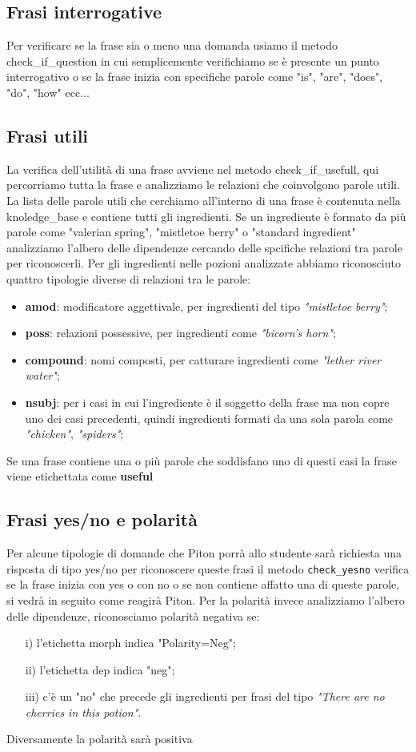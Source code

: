 \subsection{Frasi interrogative}
Per verificare se la frase sia o meno una domanda usiamo il metodo check\_if\_question in cui semplicemente verifichiamo se è presente un punto interrogativo o se la frase inizia con specifiche parole come "is", "are", "does", "do", "how" ecc...
\subsection{Frasi utili}
La verifica dell'utilità di una frase avviene nel metodo check\_if\_usefull, qui percorriamo tutta la frase e analizziamo le relazioni che coinvolgono parole utili. La lista delle parole utili che cerchiamo all'interno di una frase è contenuta nella knoledge\_base e contiene tutti gli ingredienti. Se un ingrediente è formato da più parole come "valerian spring", "mistletoe berry" o  "standard ingredient" analizziamo l'albero delle dipendenze cercando delle spcifiche relazioni tra parole per riconoscerli. Per gli ingredienti nelle pozioni analizzate abbiamo riconosciuto quattro tipologie diverse di relazioni tra le parole:
\begin{itemize}
    \item \textbf{amod}: modificatore aggettivale, per ingredienti del tipo \textit{"mistletoe berry"};
    \item \textbf{poss}: relazioni possessive, per ingredienti come \textit{"bicorn's horn"};
    \item \textbf{compound}: nomi composti, per catturare ingredienti come \textit{"lether river water"};
    \item \textbf{nsubj}: per i casi in cui l'ingrediente è il soggetto della frase ma non copre uno dei casi precedenti, quindi ingredienti formati da una sola parola come \textit{"chicken"}, \textit{"spiders"};
\end{itemize}
Se una frase contiene una o più parole che soddisfano uno di questi casi la frase viene etichettata come \textbf{useful}

\subsection{Frasi yes/no e polarità}
Per alcune tipologie di domande che Piton porrà allo studente sarà richiesta una risposta di tipo yes/no per riconoscere queste frasi il metodo \texttt{check\_yesno} verifica se la frase inizia con yes o con no o se non contiene affatto una di queste parole, si vedrà in seguito come reagirà Piton.
Per la polarità invece analizziamo l'albero delle dipendenze, riconosciamo polarità negativa se:
\begin{itemize}
    \item[i)] l'etichetta morph indica "Polarity=Neg";
    \item[ii)] l'etichetta dep indica "neg";
    \item[iii)] c'è un "no" che precede gli ingredienti per frasi del tipo \textit{"There are no cherries in this potion"}.
\end{itemize}
Diversamente la polarità sarà positiva
